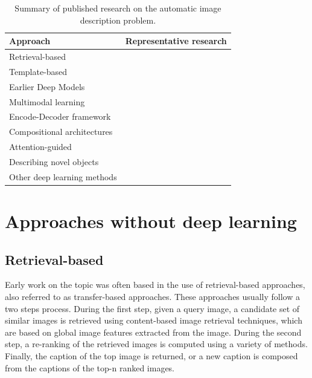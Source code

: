 \begin{table}[ht]
\centering
\caption{Summary of published research on the automatic image description problem.}
\label{tab:overview}
\begin{tabular}[t]{p{} p{}}
    \toprule
    Approach & Representative research\\
    \midrule
    Retrieval-based & \citet{Farhadi2010, Ordonez2011, Gupta2012, Kuznetsova2012, Hodosh2013a, Kuznetsova2014, Mason2015, Hodosh2013b}\\
    Template-based &  \citet{Yang2011, Kulkarni2011, Li2011, Mitchell2012, Ushiku2015}\\
    Earlier Deep Models &  \citet{Socher2014, Karpathy2014, Ma2015, Yan2015, Lebret2015a, Yagcioglu2015}\\
    Multimodal learning & \citet{Kiros2014a, Mao2015_mRNN, Karpathy2015, Chen2015}\\
    Encode-Decoder framework & \citet{Kiros2014b, Vinyals2015, Donahue2015, Jia2015, Wu2016, Pu2016_DGDN}\\ 
    Compositional architectures & \citet{Fang2015, Tran2016, Ma2016, Oruganti2016, Wang2016_Parallel, Fu2017}\\
    Attention-guided & \citet{Xu2015, You2016, Yang2016_RevNet, Zhou2017, Khademy2018, Anderson2018_BUTD, Jiang2018}\\
    Describing novel objects & \citet{Mao2015_Child, Hendricks2016}\\ 
    Other deep learning methods & \citet{Pu2016_VAE, Dai2017, Shetty2017, Ren2017, Rennie2017, Zhang2017, Anderson2018_SemiSup, Feng2018, Lindh2018}\\
    \bottomrule
\end{tabular}
\end{table}


\section{Approaches without deep learning}

\subsection{Retrieval-based} \label{sec:retrieval-based_methods}

Early work on the topic was often based in the use of retrieval-based approaches, also referred to as transfer-based approaches. These approaches usually follow a two steps process. During the first step, given a query image, a candidate set of similar images is retrieved using content-based image retrieval techniques, which are based on global image features extracted from the image. During the second step, a re-ranking of the retrieved images is computed using a variety of methods. Finally, the caption of the top image is returned, or a new caption is composed from the captions of the top-n ranked images.

